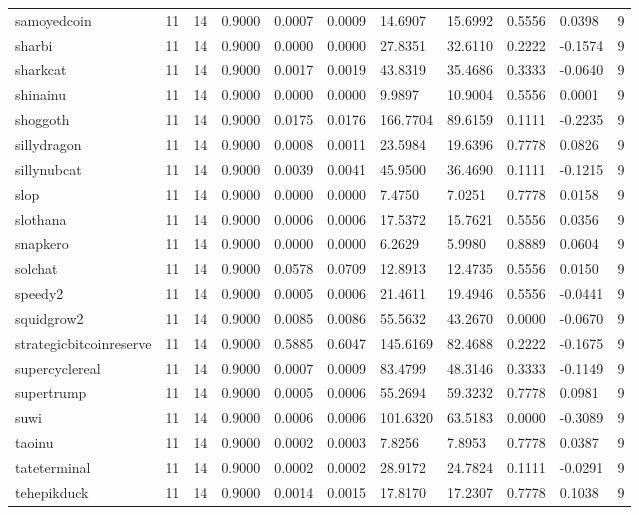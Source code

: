 \begin{table}[htbp]
\begin{tabular}{lllllllllll}
samoyedcoin & 11 & 14 & 0.9000 & 0.0007 & 0.0009 & 14.6907 & 15.6992 & 0.5556 & 0.0398 & 9 \\
sharbi & 11 & 14 & 0.9000 & 0.0000 & 0.0000 & 27.8351 & 32.6110 & 0.2222 & -0.1574 & 9 \\
sharkcat & 11 & 14 & 0.9000 & 0.0017 & 0.0019 & 43.8319 & 35.4686 & 0.3333 & -0.0640 & 9 \\
shinainu & 11 & 14 & 0.9000 & 0.0000 & 0.0000 & 9.9897 & 10.9004 & 0.5556 & 0.0001 & 9 \\
shoggoth & 11 & 14 & 0.9000 & 0.0175 & 0.0176 & 166.7704 & 89.6159 & 0.1111 & -0.2235 & 9 \\
sillydragon & 11 & 14 & 0.9000 & 0.0008 & 0.0011 & 23.5984 & 19.6396 & 0.7778 & 0.0826 & 9 \\
sillynubcat & 11 & 14 & 0.9000 & 0.0039 & 0.0041 & 45.9500 & 36.4690 & 0.1111 & -0.1215 & 9 \\
slop & 11 & 14 & 0.9000 & 0.0000 & 0.0000 & 7.4750 & 7.0251 & 0.7778 & 0.0158 & 9 \\
slothana & 11 & 14 & 0.9000 & 0.0006 & 0.0006 & 17.5372 & 15.7621 & 0.5556 & 0.0356 & 9 \\
snapkero & 11 & 14 & 0.9000 & 0.0000 & 0.0000 & 6.2629 & 5.9980 & 0.8889 & 0.0604 & 9 \\
solchat & 11 & 14 & 0.9000 & 0.0578 & 0.0709 & 12.8913 & 12.4735 & 0.5556 & 0.0150 & 9 \\
speedy2 & 11 & 14 & 0.9000 & 0.0005 & 0.0006 & 21.4611 & 19.4946 & 0.5556 & -0.0441 & 9 \\
squidgrow2 & 11 & 14 & 0.9000 & 0.0085 & 0.0086 & 55.5632 & 43.2670 & 0.0000 & -0.0670 & 9 \\
strategicbitcoinreserve & 11 & 14 & 0.9000 & 0.5885 & 0.6047 & 145.6169 & 82.4688 & 0.2222 & -0.1675 & 9 \\
supercyclereal & 11 & 14 & 0.9000 & 0.0007 & 0.0009 & 83.4799 & 48.3146 & 0.3333 & -0.1149 & 9 \\
supertrump & 11 & 14 & 0.9000 & 0.0005 & 0.0006 & 55.2694 & 59.3232 & 0.7778 & 0.0981 & 9 \\
suwi & 11 & 14 & 0.9000 & 0.0006 & 0.0006 & 101.6320 & 63.5183 & 0.0000 & -0.3089 & 9 \\
taoinu & 11 & 14 & 0.9000 & 0.0002 & 0.0003 & 7.8256 & 7.8953 & 0.7778 & 0.0387 & 9 \\
tateterminal & 11 & 14 & 0.9000 & 0.0002 & 0.0002 & 28.9172 & 24.7824 & 0.1111 & -0.0291 & 9 \\
tehepikduck & 11 & 14 & 0.9000 & 0.0014 & 0.0015 & 17.8170 & 17.2307 & 0.7778 & 0.1038 & 9 \\

\end{tabular}
\end{table}
